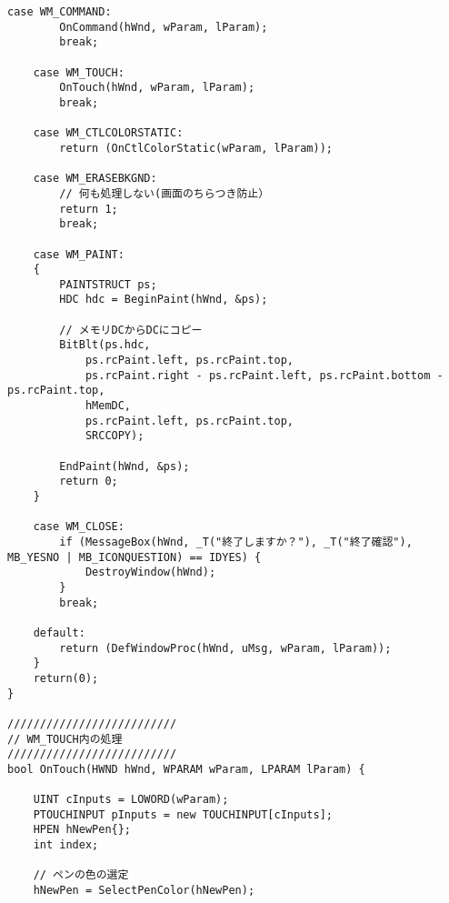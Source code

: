 \begin{lstlisting}[caption=UserInfoWindow.cpp]
	case WM_COMMAND:
		OnCommand(hWnd, wParam, lParam);
		break;

	case WM_TOUCH:
		OnTouch(hWnd, wParam, lParam);
		break;

	case WM_CTLCOLORSTATIC:
		return (OnCtlColorStatic(wParam, lParam));

	case WM_ERASEBKGND:
		// 何も処理しない(画面のちらつき防止）
		return 1;
		break;

	case WM_PAINT:
	{
		PAINTSTRUCT ps;
		HDC hdc = BeginPaint(hWnd, &ps);

		// メモリDCからDCにコピー
		BitBlt(ps.hdc,
			ps.rcPaint.left, ps.rcPaint.top,
			ps.rcPaint.right - ps.rcPaint.left, ps.rcPaint.bottom - ps.rcPaint.top,
			hMemDC,
			ps.rcPaint.left, ps.rcPaint.top,
			SRCCOPY);

		EndPaint(hWnd, &ps);
		return 0;
	}

	case WM_CLOSE:
		if (MessageBox(hWnd, _T("終了しますか？"), _T("終了確認"), MB_YESNO | MB_ICONQUESTION) == IDYES) {
			DestroyWindow(hWnd);
		}
		break;

	default:
		return (DefWindowProc(hWnd, uMsg, wParam, lParam));
	}
	return(0);
}

//////////////////////////
// WM_TOUCH内の処理
//////////////////////////
bool OnTouch(HWND hWnd, WPARAM wParam, LPARAM lParam) {

	UINT cInputs = LOWORD(wParam);
	PTOUCHINPUT pInputs = new TOUCHINPUT[cInputs];
	HPEN hNewPen{};
	int index;

	// ペンの色の選定
	hNewPen = SelectPenColor(hNewPen);


\end{lstlisting}
